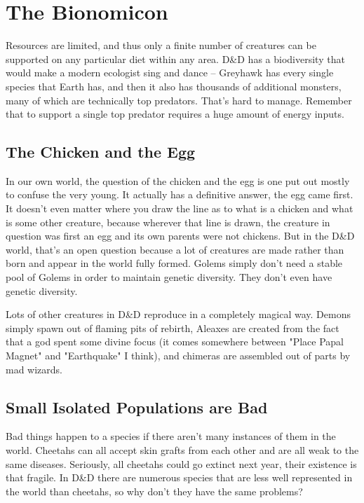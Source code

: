 \section{The Bionomicon} %
\vspace*{-10pt}

Resources are limited, and thus only a finite number of creatures can be supported on any particular diet within any area. D\&D has a biodiversity that would make a modern ecologist sing and dance -- Greyhawk has every single species that Earth has, and then it also has thousands of additional monsters, many of which are technically top predators. That's hard to manage. Remember that to support a single top predator requires a huge amount of energy inputs.

\subsection{The Chicken and the Egg}

In our own world, the question of the chicken and the egg is one put out mostly to confuse the very young. It actually has a definitive answer, the egg came first. It doesn't even matter where you draw the line as to what is a chicken and what is some other creature, because wherever that line is drawn, the creature in question was first an egg and its own parents were not chickens. But in the D\&D world, that's an open question because a lot of creatures are made rather than born and appear in the world fully formed. Golems simply don't need a stable pool of Golems in order to maintain genetic diversity. They don't even have genetic diversity.

Lots of other creatures in D\&D reproduce in a completely magical way. Demons simply spawn out of flaming pits of rebirth, Aleaxes are created from the fact that a god spent some divine focus (it comes somewhere between "Place Papal Magnet" and "Earthquake" I think), and chimeras are assembled out of parts by mad wizards.

\subsection{Small Isolated Populations are Bad}

Bad things happen to a species if there aren't many instances of them in the world. Cheetahs can all accept skin grafts from each other and are all weak to the same diseases. Seriously, all cheetahs could go extinct next year, their existence is that fragile. In D\&D there are numerous species that are less well represented in the world than cheetahs, so why don't they have the same problems?

